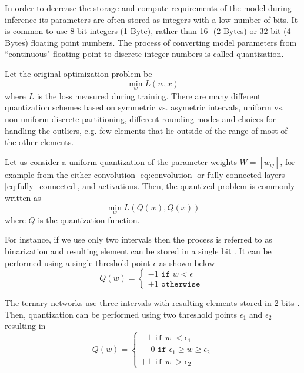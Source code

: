\documentclass{article}
\begin{document}
In order to decrease the storage and compute requirements of the model during inference its parameters are often stored as integers with a low number of bits. It is common to use 8-bit integers (1 Byte), rather than 16- (2 Bytes) or 32-bit (4 Bytes) floating point numbers. The process of converting model parameters from ``continuous" floating point to discrete integer numbers is called quantization.

Let the original optimization problem be
\begin{equation}
\min_w L(w,x)
\label{eq:orig}
\end{equation}
where $L$ is the loss measured during training. There are many different quantization schemes based on symmetric vs. asymetric intervals, uniform vs. non-uniform discrete partitioning, different rounding modes and choices for handling the outliers, e.g. few elements that lie outside of the range of most of the other elements.

Let us consider a uniform quantization of the parameter weights $W = [w_{ij}]$, for example from the either convolution \eqref{eq:convolution} or fully connected layers \eqref{eq:fully_connected}, and activations. Then, the quantized problem is commonly written as
\begin{equation}
\min_w L(Q(w),Q(x))
\label{eq:quant}
\end{equation}
where $Q$ is the quantization function.

For instance, if we use only two intervals then the process is referred to as binarization and resulting element can be stored in a single bit \cite{Courbariaux2015,Courbariaux2016,Hubara2016,Rastegari2016}. It can be performed using a single threshold point $\epsilon$ as shown below
\begin{equation}
Q(w) = \left\{ \begin{array}{l} -1 \texttt{ if } w < \epsilon \\ +1 \texttt{ otherwise }  \end{array} \right.
\label{eq:binary}
\end{equation}

The ternary networks use three intervals with resulting elements stored in 2 bits \cite{Li2016,Mellempudi2017,Choi2018}. Then, quantization can be performed using two threshold points $\epsilon_1$ and $\epsilon_2$ resulting in
\begin{equation}
Q(w) = \left\{ \begin{array}{l} -1 \texttt{ if } w\phantom{|} < \epsilon_1 \\ \phantom{-}0 \texttt{ if } \epsilon_1 \ge w \ge \epsilon_2 \\ +1 \texttt{ if } w\phantom{|} > \epsilon_2 \end{array} \right.
\label{eq:ternary}
\end{equation}
\end{document}
